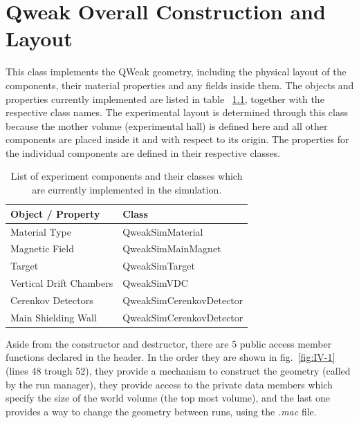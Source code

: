 \chapter{Qweak Overall Construction and Layout}\label{CHP_IV}

This class implements the QWeak geometry, including the physical
layout of the components, their material properties and any fields
inside them. The objects and properties currently implemented are
listed in table ~\ref{tbl:IV-I}, together with the respective class
names.  The experimental layout is determined through this class
because the mother volume (experimental hall) is defined here and all
other components are placed inside it and with respect to its origin.
The properties for the individual components are defined in their
respective classes.

\begin{table}
\begin{center}
\begin{tabular}{ll}
\hline 
 {\bf Object / Property} &  {\bf Class}                 \\
\hline 
 Material Type           &  QweakSimMaterial            \\
 Magnetic Field          &  QweakSimMainMagnet          \\
 Target                  &  QweakSimTarget              \\
 Vertical Drift Chambers &  QweakSimVDC                 \\
 Cerenkov Detectors      &  QweakSimCerenkovDetector    \\
 Main Shielding Wall     &  QweakSimCerenkovDetector    \\
\hline
\end{tabular}
\end{center}
\caption{List of experiment components and their classes which are
         currently implemented in the simulation.}
\label{tbl:IV-I}
\end{table}

Aside from the constructor and destructor, there are 5 public access
member functions declared in the header.  In the order they are shown
in fig.~\ref{fig:IV-1} (lines 48 trough 52), they provide a mechanism
to construct the geometry (called by the run manager), they provide
access to the private data members which specify the size of the world
volume (the top most volume), and the last one provides a way to change
the geometry between runs, using the {\em *.mac} file.

